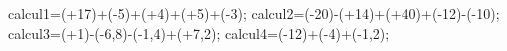 \documentclass[exercice]{thedocument}%
\begin{document}
%
\>calcul1=(+17)+(-5)+(+4)+(+5)+(-3);%
\>calcul2=(-20)-(+14)+(+40)+(-12)-(-10);%
\>calcul3=(+1)-(-6,8)-(-1,4)+(+7,2);%
\>calcul4=(-12)+(-4)+(-1,2);%
%
\end{document}
